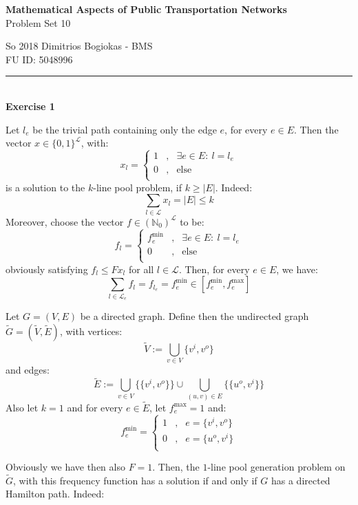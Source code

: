\documentclass[12pt]{article}
\newenvironment{a_enum}{\begin{enumerate}[label=(\alph{*})]}{\end{enumerate}} %
\newcommand\HRule{\rule{\linewidth}{0.1mm}}
\begin{document}
\begin{center}
{\bf Mathematical Aspects of Public Transportation Networks}\\
Problem Set 10
\end{center}
So 2018 \hfill Dimitrios Bogiokas - BMS\\
\phantom{X}\hfill FU ID: 5048996\\
\HRule\\
{\bf Exercise 1} \begin{a_enum}
\item Let $l_e$ be the trivial path containing only the edge $e$, for every $e\in E$. Then the vector $x\in\{0,1\}^{\mathcal{L}}$, with:
$$x_l=\left\{\begin{array}{lcl}
1&,&\exists e\in E:\ l=l_e\\
0&,&\text{else}\\
\end{array}\right.$$
is a solution to the $k$-line pool problem, if $k\geq|E|$. Indeed:
$$\sum_{l\in\mathcal{L}}x_l=|E|\leq k$$
Moreover, choose the vector $f\in(\mathbb{N}_0)^{\mathcal{L}}$ to be:
$$f_l=\left\{\begin{array}{lcl}
f_e^{\min}&,&\exists e\in E:\ l=l_e\\
0&,&\text{else}\\
\end{array}\right.$$
obviously satisfying $f_l\leq Fx_l$ for all $l\in\mathcal{L}$.
Then, for every $e\in E$, we have:
$$\sum_{l\in\mathcal{L}_e}f_l=f_{l_e}=f_e^{\min}\in[f_e^{\min},f_e^{\max}]$$
\item Let $G=(V,E)$ be a directed graph. Define then the undirected graph $\tilde G=(\tilde V,\tilde E)$, with vertices:
$$\tilde V:=\bigcup_{v\in V}\{v^i,v^o\}$$
and edges:
$$\tilde E:=\bigcup_{v\in V}\big\{\{v^i,v^o\}\big\}\cup\bigcup_{(u,v)\in E}\big\{\{u^o,v^i\}\big\}$$
Also let $k=1$ and for every $e\in\tilde E$, let $f_e^{\max}=1$ and:
$$f_e^{\min}=\left\{\begin{array}{lcl}
1&,&e=\{v^i,v^o\}\\
0&,&e=\{u^o,v^i\}\\
\end{array}\right.$$

Obviously we have then also $F=1$. Then, the $1$-line pool generation problem on $\tilde G$, with this frequency function has a solution if and only if $G$ has a directed Hamilton path. Indeed:


\end{a_enum}
\end{document}
